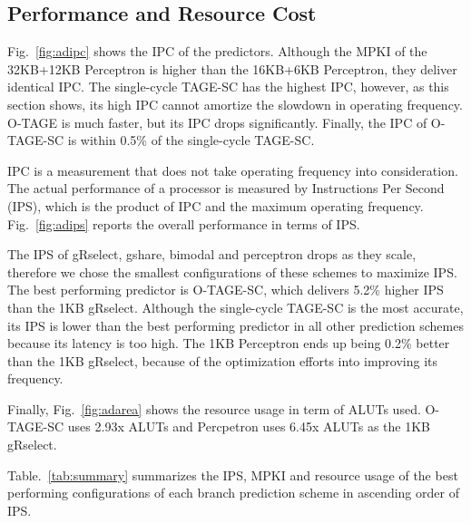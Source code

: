 \subsection{Performance and Resource Cost}
\label{sec:eval:advanced:perf}
Fig.~\ref{fig:adipc} shows the IPC of the predictors. Although the MPKI of the 32KB+12KB Perceptron is higher than the 16KB+6KB Perceptron, they deliver identical IPC. The single-cycle \mbox{TAGE-SC} has the highest IPC, however, as this section shows, its high IPC cannot amortize the slowdown in operating frequency. \mbox{O-TAGE} is much faster, but its IPC drops significantly. Finally, the IPC of \mbox{O-TAGE-SC} is within 0.5\% of the single-cycle \mbox{TAGE-SC}.

IPC is a measurement that does not take operating frequency into consideration. The actual performance of a processor is measured by Instructions Per Second (IPS), which is the product of IPC and the maximum operating frequency. Fig.~\ref{fig:adips} reports the overall performance in terms of IPS.

The IPS of gRselect, gshare, bimodal and perceptron drops as they scale, therefore we chose the smallest configurations of these schemes to maximize IPS. The best performing predictor is \mbox{O-TAGE-SC}, which delivers 5.2\% higher IPS than the 1KB gRselect. Although the single-cycle \mbox{TAGE-SC} is the most accurate, its IPS is lower than the best performing predictor in all other prediction schemes  because its latency is too high. The 1KB Perceptron ends up being 0.2\% better than the 1KB gRselect, because of the optimization efforts into improving its frequency. 

Finally, Fig.~\ref{fig:adarea} shows the resource usage in term of ALUTs used. \mbox{O-TAGE-SC} uses 2.93x ALUTs and Percpetron uses 6.45x ALUTs as the 1KB gRselect.

Table.~\ref{tab:summary} summarizes the IPS, MPKI and resource usage of the best performing configurations of each branch prediction scheme in ascending order of IPS.

